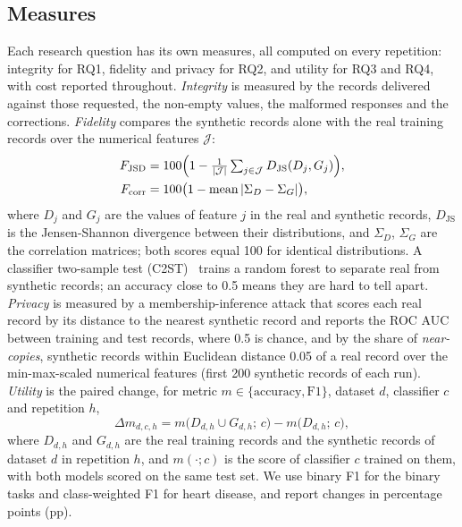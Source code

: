 \documentclass[conference]{IEEEtran}
\begin{document}
\subsection{Measures}
Each research question has its own measures, all computed on every repetition: integrity for RQ1, fidelity and privacy for RQ2, and utility for RQ3 and RQ4, with cost reported throughout. \emph{Integrity} is measured by the records delivered against those requested, the non-empty values, the malformed responses and the corrections. \emph{Fidelity} compares the synthetic records alone with the real training records over the numerical features $\mathcal{J}$:
\begin{equation}
\begin{aligned}
F_{\mathrm{JSD}}&=100\Bigl(1-\tfrac{1}{|\mathcal{J}|}
\textstyle\sum_{j\in\mathcal{J}}D_{\mathrm{JS}}(D_j,G_j)\Bigr),\\
F_{\mathrm{corr}}&=100\bigl(1-\operatorname{mean}|\Sigma_D-\Sigma_G|\bigr),
\end{aligned}
\label{eq:fidelity}
\end{equation}
where $D_j$ and $G_j$ are the values of feature $j$ in the real and synthetic records, $D_{\mathrm{JS}}$ is the Jensen-Shannon divergence between their distributions, and $\Sigma_D$, $\Sigma_G$ are the correlation matrices; both scores equal 100 for identical distributions. A classifier two-sample test (C2ST)~\cite{lopezpaz2017c2st} trains a random forest to separate real from synthetic records; an accuracy close to 0.5 means they are hard to tell apart. \emph{Privacy} is measured by a membership-inference attack that scores each real record by its distance to the nearest synthetic record and reports the ROC AUC between training and test records, where 0.5 is chance, and by the share of \emph{near-copies}, synthetic records within Euclidean distance 0.05 of a real record over the min-max-scaled numerical features (first 200 synthetic records of each run). \emph{Utility} is the paired change, for metric $m\in\{\mathrm{accuracy},\mathrm{F1}\}$, dataset $d$, classifier $c$ and repetition $h$,
\begin{equation}
\Delta m_{d,c,h}=m\bigl(D_{d,h}\cup G_{d,h};\,c\bigr)-m\bigl(D_{d,h};\,c\bigr),
\label{eq:utility}
\end{equation}
where $D_{d,h}$ and $G_{d,h}$ are the real training records and the synthetic records of dataset $d$ in repetition $h$, and $m(\cdot;c)$ is the score of classifier $c$ trained on them, with both models scored on the same test set. We use binary F1 for the binary tasks and class-weighted F1 for heart disease, and report changes in percentage points (pp).
\end{document}
